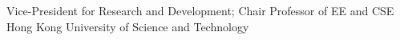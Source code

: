 %
{Vice-President for Research and Development; Chair Professor of EE and CSE}%
{Hong Kong University of Science and Technology}%
{\quad{}}